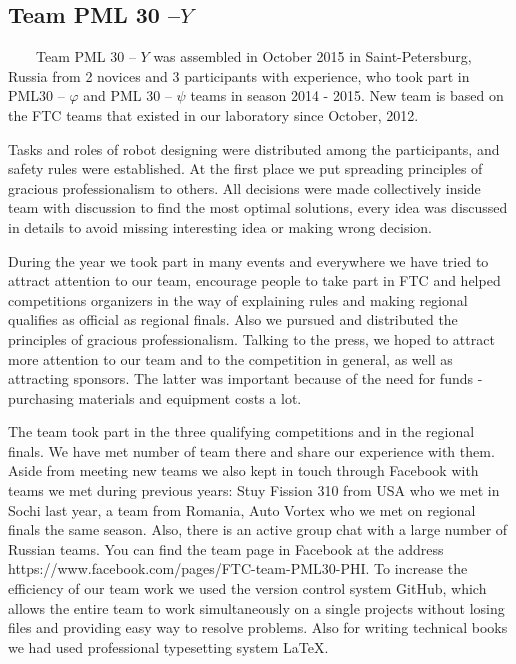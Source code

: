 
\subsection{Team PML 30 --${Y}$} 
	
	
        Team PML 30 -- ${Y}$ was assembled in October 2015 in Saint-Petersburg, Russia from 2 novices and 3 participants with experience, who took part in PML30 -- ${\varphi}$ and PML 30 -- ${\psi}$ teams in season 2014 - 2015. New team is based on the FTC teams that existed in our laboratory since October, 2012. 
	
	Tasks and roles of robot designing were distributed among the participants, and safety rules were established. At the first place we put spreading principles of gracious professionalism to others. All decisions were made collectively inside team with discussion to find the most optimal solutions, every idea was discussed in details to avoid missing interesting idea or making wrong decision. 
	
	During the year we took part in many events and everywhere we have tried to attract attention to our team, encourage people to take part in FTC and helped competitions organizers in the way of explaining rules and making regional qualifies as official as regional finals. Also we pursued and distributed the principles of gracious professionalism. Talking to the press, we hoped to attract more attention to our team and to the competition in general, as well as attracting sponsors. The latter was important because of the need for funds - purchasing materials and equipment costs a lot.
	
	The team took part in the three qualifying competitions and in the regional finals. We have met number of team there and share our experience with them. Aside from meeting new teams we also kept in touch through Facebook with teams we met during previous years: Stuy Fission 310 from USA who we met in Sochi last year, a team from Romania, Auto Vortex who we met on regional finals the same season. Also, there is an active group chat with a large number of Russian teams. You can find the team page in Facebook at the address https://www.facebook.com/pages/FTC-team-PML30-PHI.
	To increase the efficiency of our team work we used the version control system GitHub, which allows the entire team to work simultaneously on a single projects without losing files and providing easy way to resolve problems. Also for writing technical books we had used professional typesetting system LaTeX.
	
